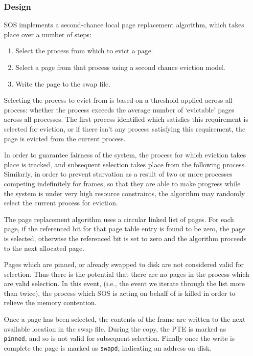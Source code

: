 \documentclass[a4paper,12pt]{article}
\begin{document}
\subsubsection{Design}
SOS implements a second-chance local page replacement algorithm, which takes
place over a number of steps:

\begin{enumerate}
\item Select the process from which to evict a page.
\item Select a page from that process using a second chance eviction model.
\item Write the page to the swap file.
\end{enumerate}

Selecting the process to evict from is based on a threshold applied across all
process: whether the process exceeds the average number of `evictable' pages
across all processes.  The first process identified which satisfies this
requirement is selected for eviction, or if there isn't any process satisfying
this requirement, the page is evicted from the current process.

In order to guarantee fairness of the system, the process for which eviction
takes place is tracked, and subsequent selection takes place from the
following process.  Similarly, in order to prevent starvation as a result of
two or more processes competing indefinitely for frames, so that they are able
to make progress while the system is under very high resource constraints, the
algorithm may randomly select the current process for eviction.

The page replacement algorithm uses a circular linked list of pages.  For each
page, if the referenced bit for that page table entry is found to be zero, the
page is selected, otherwise the referenced bit is set to zero and the
algorithm proceeds to the next allocated page.

Pages which are pinned, or already swapped to disk are not considered valid
for selection.  Thus there is the potential that there are no pages in the
process which are valid selection.  In this event, (i.e., the event we iterate
through the list more than twice), the process which SOS is acting on behalf
of is killed in order to relieve the memory contention.

Once a page has been selected, the contents of the frame are written to the
next available location in the swap file.  During the copy, the PTE is marked
as \texttt{pinned}, and so is not valid for subsequent selection.  Finally
once the write is complete the page is marked as \texttt{swapd}, indicating an
address on disk.
\end{document}
